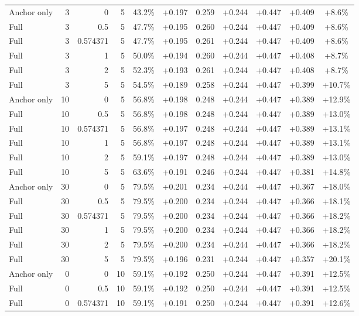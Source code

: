 \begin{table}[htbp]
\begin{tabular}{lrrrccccccc}
Anchor only & 3 & 0 & 5 & 43.2\% & +0.197 & 0.259 & +0.244 & +0.447 & +0.409 & +8.6\% \\
Full & 3 & 0.5 & 5 & 47.7\% & +0.195 & 0.260 & +0.244 & +0.447 & +0.409 & +8.6\% \\
Full & 3 & 0.574371 & 5 & 47.7\% & +0.195 & 0.261 & +0.244 & +0.447 & +0.409 & +8.6\% \\
Full & 3 & 1 & 5 & 50.0\% & +0.194 & 0.260 & +0.244 & +0.447 & +0.408 & +8.7\% \\
Full & 3 & 2 & 5 & 52.3\% & +0.193 & 0.261 & +0.244 & +0.447 & +0.408 & +8.7\% \\
Full & 3 & 5 & 5 & 54.5\% & +0.189 & 0.258 & +0.244 & +0.447 & +0.399 & +10.7\% \\
Anchor only & 10 & 0 & 5 & 56.8\% & +0.198 & 0.248 & +0.244 & +0.447 & +0.389 & +12.9\% \\
Full & 10 & 0.5 & 5 & 56.8\% & +0.198 & 0.248 & +0.244 & +0.447 & +0.389 & +13.0\% \\
Full & 10 & 0.574371 & 5 & 56.8\% & +0.197 & 0.248 & +0.244 & +0.447 & +0.389 & +13.1\% \\
Full & 10 & 1 & 5 & 56.8\% & +0.197 & 0.248 & +0.244 & +0.447 & +0.389 & +13.1\% \\
Full & 10 & 2 & 5 & 59.1\% & +0.197 & 0.248 & +0.244 & +0.447 & +0.389 & +13.0\% \\
Full & 10 & 5 & 5 & 63.6\% & +0.191 & 0.246 & +0.244 & +0.447 & +0.381 & +14.8\% \\
Anchor only & 30 & 0 & 5 & 79.5\% & +0.201 & 0.234 & +0.244 & +0.447 & +0.367 & +18.0\% \\
Full & 30 & 0.5 & 5 & 79.5\% & +0.200 & 0.234 & +0.244 & +0.447 & +0.366 & +18.1\% \\
Full & 30 & 0.574371 & 5 & 79.5\% & +0.200 & 0.234 & +0.244 & +0.447 & +0.366 & +18.2\% \\
Full & 30 & 1 & 5 & 79.5\% & +0.200 & 0.234 & +0.244 & +0.447 & +0.366 & +18.2\% \\
Full & 30 & 2 & 5 & 79.5\% & +0.200 & 0.234 & +0.244 & +0.447 & +0.366 & +18.2\% \\
Full & 30 & 5 & 5 & 79.5\% & +0.196 & 0.231 & +0.244 & +0.447 & +0.357 & +20.1\% \\
Anchor only & 0 & 0 & 10 & 59.1\% & +0.192 & 0.250 & +0.244 & +0.447 & +0.391 & +12.5\% \\
Full & 0 & 0.5 & 10 & 59.1\% & +0.192 & 0.250 & +0.244 & +0.447 & +0.391 & +12.5\% \\
Full & 0 & 0.574371 & 10 & 59.1\% & +0.191 & 0.250 & +0.244 & +0.447 & +0.391 & +12.6\% \\

\end{tabular}
\end{table}
